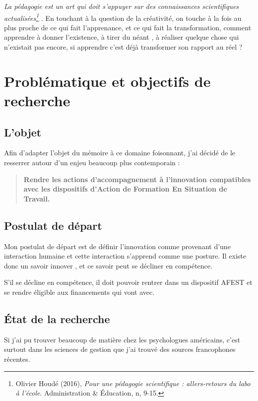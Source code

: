 \documentclass{article}
\begin{document}
\og \textit{La pédagogie est un art qui doit s'appuyer sur des connaissances scientifiques actualisées\footnote{Olivier Houdé (2016), \emph{Pour une pédagogie scientifique : allers-retours du labo à l'école}. Administration \& Éducation, n, 9-15.} }\fg{}. En touchant à la question de la créativité, on touche à la fois au plus proche de ce qui fait l'apprenance, et ce qui fait la transformation, comment apprendre à \og donner l'existence\fg{}, à \og tirer du néant \fg{}, à réaliser quelque chose qui n'existait pas encore, si apprendre c'est déjà transformer son rapport au réel ?\label{neant}

\section{Problématique et objectifs de recherche}

\subsection{L'objet}

Afin d'adapter l'objet du mémoire à ce domaine foisonnant, j'ai décidé de le resserrer autour d'un enjeu beaucoup plus contemporain :

\begin{quote}\textbf{Rendre les actions d'accompagnement à l'innovation  compatibles avec les dispositifs d'Action de Formation En Situation de Travail.}
\end{quote}

\subsection{Postulat de départ}

Mon postulat de départ est de définir l'innovation comme provenant d'une interaction humaine et cette interaction s'apprend comme une posture. Il existe donc un \og savoir innover \fg{}, et ce savoir peut se décliner en compétence. 

S'il se décline en compétence, il doit pouvoir rentrer dans un dispositif AFEST et se rendre éligible aux financements qui vont avec.

\subsection{État de la recherche}

Si j'ai pu trouver beaucoup de matière chez les psychologues américains, c'est surtout dans les sciences de gestion que j'ai trouvé des sources francophones récentes.
\end{document}
